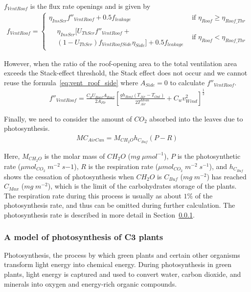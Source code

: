 \documentclass[a4paper]{article}
\begin{document}
\(f_{VentRoof}\) is the flux rate openings and is given by
\begin{gather}
  f_{VentRoof} =
  \begin{cases}
    \eta_{InsScr} f''_{VentRoof} + 0.5f_{leakage} & \text{if~} \eta_{Roof} \geq \eta_{Roof\_Thr} \\
    \begin{split}
      & \eta_{InsScr} [U_{ThScr}f''_{VentRoof} + \\
      & (1-U_{ThScr})f_{VentRoofSide} \eta_{Side}] + 0.5 f_{leakage}
    \end{split}                    & \text{if~}  \eta_{Roof} < \eta_{Roof\_Thr}
  \end{cases}
\end{gather}

However, when the ratio of the roof-opening area to the total ventilation area exceeds the Stack-effect threshold, the Stack effect does not occur and we cannot reuse the formula~\eqref{eq:vent_roof_side} where \(A_{Side} = 0\) to
calculate \(f''_{VentRoof}\).
\begin{align}
  f''_{VentRoof} = \frac{C_d U_{Roof} A_{Roof}}{2A_{Flr}} {\left[\frac{gh_{Roof}(T_{Air} - T_{Out})}{2T^{Mean}_{Air}} + C_w v^2_{Wind}\right]}^{ \frac{1}{2}}
\end{align}

Finally, we need to consider the amount of \(CO_2\) absorbed into the leaves due to photosynthesis.
\begin{align}
  MC_{AirCan} = M_{CH_2O} h_{C_{Buf}} (P - R)
\end{align}

Here, \(M_{CH_2O}\) is the molar mass of \(CH_2O\) (\(mg\;\mu mol^{-1}\)), \(P\) is the photosynthetic rate (\(\mu mol_{CO_2}\;m^{-2}\;s{-1}\)), \(R\) is the respiration rate (\(\mu mol_{CO_2}\;m^{-2}\;s^{-1}\)), and \(h_{C_{Buf}}\) shows the cessation of photosynthesis when \(CH_2O\) is \(C_{Buf}\) (\(mg\;m^{-2}\)) has reached \(C_{Max}\) (\(mg\;m^{-2}\)), which is the limit of the carbohydrates storage of the plants. The respiration rate during this process is usually as about \(1\%\) of the photosynthesis rate, and thus can be omitted during further calculation. The photosynthesis rate is described in more detail in Section~\ref{sssec:photo_c3}.

\subsubsection{A model of photosynthesis of C3 plants}\label{sssec:photo_c3}
Photosynthesis, the process by which green plants and certain other organisms transform light energy into chemical energy. During photosynthesis in green plants, light energy is captured and used to convert water, carbon dioxide, and minerals into oxygen and energy-rich organic compounds.
\end{document}

